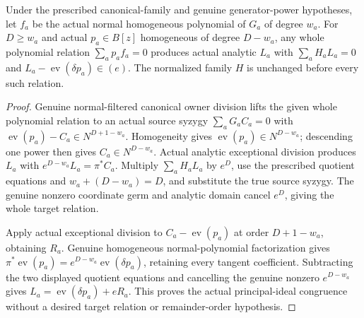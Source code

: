 \begin{theorem}
\label{hir:actual-relative-normalized-polynomial-relation-lifts}
\leanok
Under the prescribed canonical-family and genuine generator-power hypotheses,
let $f_a$ be the actual normal homogeneous polynomial of $G_a$ of degree $w_a$.
For $D\ge w_a$ and actual $p_a\in B[z]$ homogeneous of degree $D-w_a$,
any whole polynomial relation $\sum_ap_af_a=0$ produces actual analytic $L_a$
with $\sum_aH_aL_a=0$ and $L_a-\operatorname{ev}(\delta p_a)\in(e)$.
The normalized family $H$ is unchanged before every such relation.
\end{theorem}
\begin{proof}
Genuine normal-filtered canonical owner division lifts the given whole polynomial
relation to an actual source syzygy $\sum_aG_aC_a=0$ with
$\operatorname{ev}(p_a)-C_a\in N^{D+1-w_a}$. Homogeneity gives
$\operatorname{ev}(p_a)\in N^{D-w_a}$; descending one power then gives
$C_a\in N^{D-w_a}$. Actual analytic exceptional division produces $L_a$ with
$e^{D-w_a}L_a=\pi^*C_a$. Multiply $\sum_aH_aL_a$ by $e^D$, use the
prescribed quotient equations and $w_a+(D-w_a)=D$, and substitute the true
source syzygy. The genuine nonzero coordinate germ and analytic domain cancel
$e^D$, giving the whole target relation.

Apply actual exceptional division to $C_a-\operatorname{ev}(p_a)$ at order
$D+1-w_a$, obtaining $R_a$. Genuine homogeneous normal-polynomial
factorization gives $\pi^*\operatorname{ev}(p_a)=e^{D-w_a}
\operatorname{ev}(\delta p_a)$, retaining every tangent coefficient.
Subtracting the two displayed quotient equations and cancelling the genuine
nonzero $e^{D-w_a}$ gives $L_a=\operatorname{ev}(\delta p_a)+eR_a$.
This proves the actual principal-ideal congruence without a desired target
relation or remainder-order hypothesis.
\end{proof}

